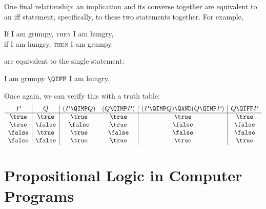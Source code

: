 One final relationship: an implication and its converse together are
equivalent to an iff statement, specifically, to these two statements
together.  For example,
%
\begin{center}
If I am grumpy, \textsc{then} I am hungry, \QAND \\
if I am hungry, \textsc{then} I am grumpy.
\end{center}
%
are equivalent to the single statement:
%
\begin{center}
I am grumpy $\QIFF$ I am hungry.
\end{center}
%
Once again, we can verify this with a truth table:
%
\[
\begin{array}{c|c|cc|c|c}
P & Q
& (P \QIMP Q) & (Q \QIMP P) 
& (P\QIMP Q) \QAND (Q \QIMP P) & Q \QIFF P \\
\hline
\true  &  \true  &\true  &\true  &\true & \true \\
\true  &  \false &\false &\true  &\false& \false\\
\false &  \true  &\true  &\false &\false& \false\\
\false &  \false &\true  &\true  &\true & \true 
\end{array}
\]

\begin{problems}

\classproblems
{}

\homeworkproblems
{}
\end{problems}

\section{Propositional Logic in Computer Programs}

